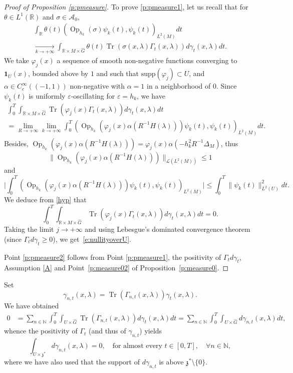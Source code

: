 \documentclass[JEP,XML,SOM,Unicode,published]{cedram}
\let\mathcal\mathscr
\newcommand{\bun}{\mathbf{1}}
\DeclareMathOperator{\Op}{Op}
\DeclareMathOperator{\Tr}{Tr}
\theoremstyle{plain}
\theoremstyle{definition}
\let\eps\varepsilon
\def\R{{\mathbb R}}
\def\N{{\mathbb N}}
\newcommand{\Tend}[2]{\mathbin{\mathop{\longrightarrow}\limits_{#1\to#2}}}
\begin{document}
\begin{proof}[Proof of Proposition \ref{p:pmeasure}]
To prove \eqref{p:pmeasure1}, let us recall that for $\theta\in L^1(\R)$ and $\sigma\in{\mathcal A}_0$,
\begin{multline*}%
\int_{\R}\theta(t)(\Op_{h_k}(\sigma)\psi_k(t),\psi_k(t))_{L^2(M)}dt\\[-5pt]
\Tend{k}{ +\infty} \int_{\R\times M\times\widehat{G}}\theta(t)\Tr(\sigma(x,\lambda)\Gamma_t(x,\lambda))d\gamma_t(x,\lambda)dt.
\end{multline*}
We take $\varphi_j(x)$ a sequence of smooth non-negative functions converging to $\bun_{U}(x)$, bounded above by $1$ and such that $\text{supp}(\varphi_j)\subset U$, and $\alpha\in C_c^\infty((-1,1))$ non-negative with $\alpha=1$ in a neighborhood of $0$.
Since $\psi_k(t)$ is uniformly $\eps$-oscillating for $\eps=h_k$, we have
\begin{multline*}
\int_0^T \int _{\R\times M\times\widehat{G}} \Tr(\varphi_j(x)\Gamma_t(x,\lambda))d\gamma_t(x,\lambda)dt\\
=\lim_{R\to +\infty} \lim_{k\to +\infty}
\int_0^T \left(\Op_{h_k}(\varphi_j(x) \alpha (R^{-1} H(\lambda))) \psi_k(t),\psi_k(t)\right)_{L^2(M)} dt.
\end{multline*}
Besides, $\Op_{h_k}(\varphi_j(x) \alpha (R^{-1} H(\lambda)))= \varphi_j(x) \alpha(-h_k^2R^{-1} \Delta_M)$, thus
\[
\| \Op_{h_k}(\varphi_j(x) \alpha (R^{-1} H(\lambda)))\|_{\mathcal L(L^2(M))}\leq 1
\]
and
\[
\biggl| \int_0^T \left(\Op_{h_k}(\varphi_j(x) \alpha (R^{-1} H(\lambda))) \psi_k(t),\psi_k(t)\right)_{L^2(M)}\biggr| \leq
\int_0^T \|\psi_k(t)\| ^2_{L^2(U)} dt.
\]
We deduce from \eqref{hyp} that
\[
\int_0^T \int _{\R\times M\times\widehat{G}}\Tr(\varphi_j(x)\Gamma_t(x,\lambda))d\gamma_t(x,\lambda)dt=0.
\]
Taking the limit $j\to +\infty$ and using Lebesgue's dominated convergence theorem (since $\Gamma_td\gamma_t\geq 0$), we get~\eqref{e:nullityoverU}.

Point \eqref{p:pmeasure2}
follows from Point \eqref{p:pmeasure1}, the positivity of $\Gamma_td\gamma_t$, Assumption \eqref{A} and Point~\eqref{p:measure02} of Proposition~\ref{p:measure0}.
\end{proof}

Set
\[
\gamma_{n,t} (x,\lambda)= \Tr\left(\Gamma_{n,t}(x,\lambda)\right) \gamma_t(x,\lambda).
\]
We have obtained
\begin{align*}
0& =\sum_{n\in\N} \int_0^T \int_{U\times \widehat G} \Tr (\Gamma_{n,t}(x,\lambda)) d\gamma_t (x,\lambda)dt=\sum_{n\in\N} \int_0^T \int_{U\times \widehat G} d\gamma_{n,t} (x,\lambda)dt,
\end{align*}
whence the positivity of $\Gamma_t$ (and thus of $\gamma_{n,t}$) yields
\[
\int_{U\times \mathfrak z^*} d\gamma_{n,t} (x,\lambda)=0,\quad \text{for almost every } t\in [0,T],\quad \forall n\in\N,
\]
where we have also used that the support of $d\gamma_{n,t}$ is above $\mathfrak z^*\setminus \{0\}$.
\end{document}
